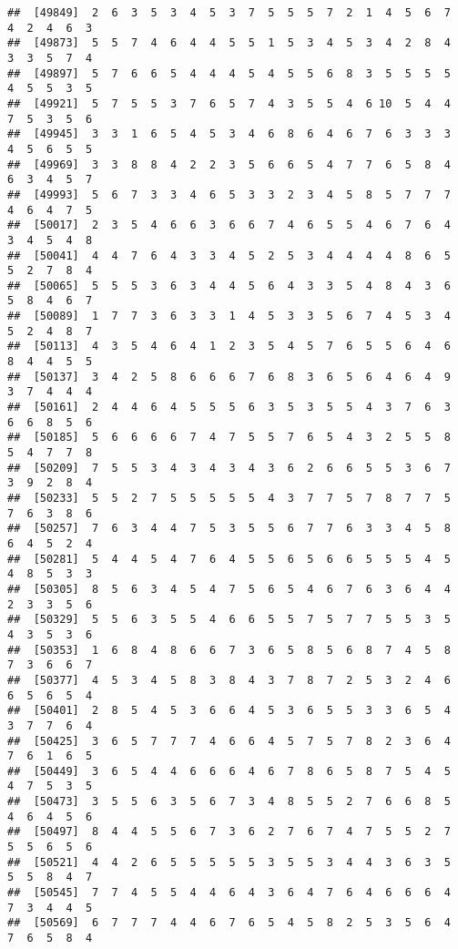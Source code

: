 \documentclass[
]{book}
\begin{document}
\begin{verbatim}
##  [49849]  2  6  3  5  3  4  5  3  7  5  5  5  7  2  1  4  5  6  7  4  2  4  6  3
##  [49873]  5  5  7  4  6  4  4  5  5  1  5  3  4  5  3  4  2  8  4  3  3  5  7  4
##  [49897]  5  7  6  6  5  4  4  4  5  4  5  5  6  8  3  5  5  5  5  4  5  5  3  5
##  [49921]  5  7  5  5  3  7  6  5  7  4  3  5  5  4  6 10  5  4  4  7  5  3  5  6
##  [49945]  3  3  1  6  5  4  5  3  4  6  8  6  4  6  7  6  3  3  3  4  5  6  5  5
##  [49969]  3  3  8  8  4  2  2  3  5  6  6  5  4  7  7  6  5  8  4  6  3  4  5  7
##  [49993]  5  6  7  3  3  4  6  5  3  3  2  3  4  5  8  5  7  7  7  4  6  4  7  5
##  [50017]  2  3  5  4  6  6  3  6  6  7  4  6  5  5  4  6  7  6  4  3  4  5  4  8
##  [50041]  4  4  7  6  4  3  3  4  5  2  5  3  4  4  4  4  8  6  5  5  2  7  8  4
##  [50065]  5  5  5  3  6  3  4  4  5  6  4  3  3  5  4  8  4  3  6  5  8  4  6  7
##  [50089]  1  7  7  3  6  3  3  1  4  5  3  3  5  6  7  4  5  3  4  5  2  4  8  7
##  [50113]  4  3  5  4  6  4  1  2  3  5  4  5  7  6  5  5  6  4  6  8  4  4  5  5
##  [50137]  3  4  2  5  8  6  6  6  7  6  8  3  6  5  6  4  6  4  9  3  7  4  4  4
##  [50161]  2  4  4  6  4  5  5  5  6  3  5  3  5  5  4  3  7  6  3  6  6  8  5  6
##  [50185]  5  6  6  6  6  7  4  7  5  5  7  6  5  4  3  2  5  5  8  5  4  7  7  8
##  [50209]  7  5  5  3  4  3  4  3  4  3  6  2  6  6  5  5  3  6  7  3  9  2  8  4
##  [50233]  5  5  2  7  5  5  5  5  5  4  3  7  7  5  7  8  7  7  5  7  6  3  8  6
##  [50257]  7  6  3  4  4  7  5  3  5  5  6  7  7  6  3  3  4  5  8  6  4  5  2  4
##  [50281]  5  4  4  5  4  7  6  4  5  5  6  5  6  6  5  5  5  4  5  4  8  5  3  3
##  [50305]  8  5  6  3  4  5  4  7  5  6  5  4  6  7  6  3  6  4  4  2  3  3  5  6
##  [50329]  5  5  6  3  5  5  4  6  6  5  5  7  5  7  7  5  5  3  5  4  3  5  3  6
##  [50353]  1  6  8  4  8  6  6  7  3  6  5  8  5  6  8  7  4  5  8  7  3  6  6  7
##  [50377]  4  5  3  4  5  8  3  8  4  3  7  8  7  2  5  3  2  4  6  6  5  6  5  4
##  [50401]  2  8  5  4  5  3  6  6  4  5  3  6  5  5  3  3  6  5  4  3  7  7  6  4
##  [50425]  3  6  5  7  7  7  4  6  6  4  5  7  5  7  8  2  3  6  4  7  6  1  6  5
##  [50449]  3  6  5  4  4  6  6  6  4  6  7  8  6  5  8  7  5  4  5  4  7  5  3  5
##  [50473]  3  5  5  6  3  5  6  7  3  4  8  5  5  2  7  6  6  8  5  4  6  4  5  6
##  [50497]  8  4  4  5  5  6  7  3  6  2  7  6  7  4  7  5  5  2  7  5  5  6  5  6
##  [50521]  4  4  2  6  5  5  5  5  5  3  5  5  3  4  4  3  6  3  5  5  5  8  4  7
##  [50545]  7  7  4  5  5  4  4  6  4  3  6  4  7  6  4  6  6  6  4  7  3  4  4  5
##  [50569]  6  7  7  7  4  4  6  7  6  5  4  5  8  2  5  3  5  6  4  7  6  5  8  4

\end{verbatim}
\end{document}
